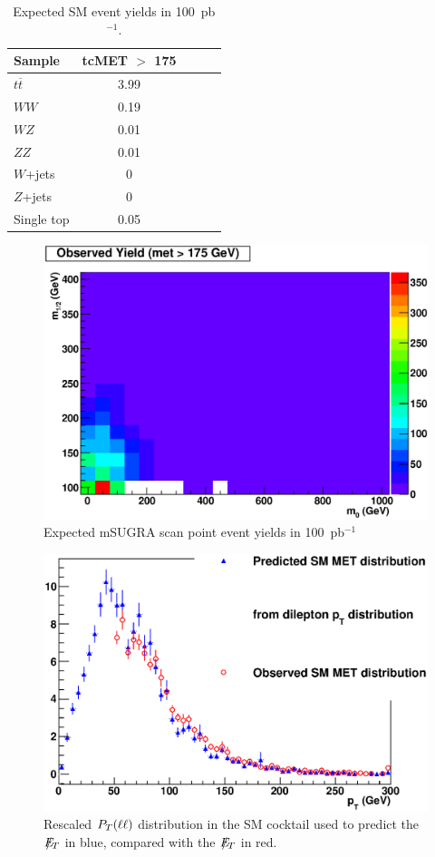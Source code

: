 \begin{table}[hbt]
\begin{center}
\begin{tabular}{|l|c|c|c|c|}\hline
Sample           & tcMET $>$ 175   \\ \hline
$t\overline{t}$  &   3.99          \\ 
$WW$             &   0.19          \\ 
$WZ$             &   0.01          \\ 
$ZZ$             &   0.01          \\ 
$W$+jets         &   0             \\
$Z$+jets         &   0             \\ 
Single top       &   0.05          \\ \hline
\end{tabular}
\caption{Expected SM event yields in 100~pb$^{-1}$.\label{tab:yields}}
\end{center}
\end{table}

\begin{figure}[htb]
\begin{center}
\includegraphics[width=0.7\linewidth]{figs/hobs175_100pb.eps}
\caption{Expected mSUGRA scan point event yields in 100~pb$^{-1}$\label{fig:hobs175_100pb}}
\end{center}
\end{figure}

\begin{figure}[htb]
\begin{center}
\includegraphics[width=0.7\linewidth]{figs/smvictory.eps}
\caption{Rescaled $P_T(\ell\ell)$ distribution in the SM cocktail used to predict the $E\!\!\!\!/_T$ in blue, compared with the $E\!\!\!\!/_T$ in red.\label{fig:smvictory}}
\end{center}
\end{figure}


